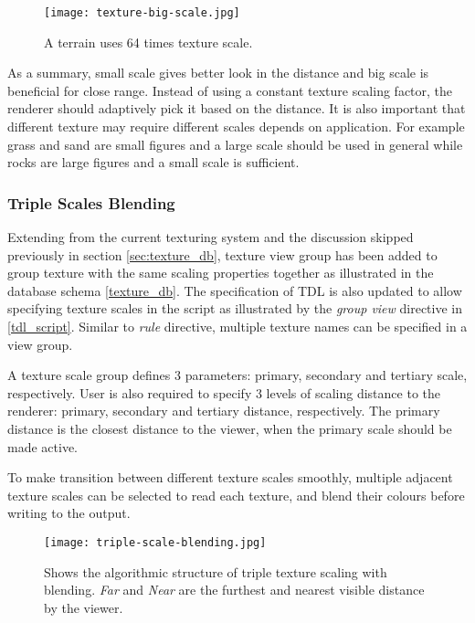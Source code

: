 \documentclass[oneside, a4paper]{report}
\begin{document}
    \begin{figure}[H]
        \texttt{[image: texture-big-scale.jpg]}
        \caption{A terrain uses 64 times texture scale.}
    \end{figure}

    As a summary, small scale gives better look in the distance and big scale is beneficial for close range. Instead of using a constant texture scaling factor, the renderer should adaptively pick it based on the distance. It is also important that different texture may require different scales depends on application. For example grass and sand are small figures and a large scale should be used in general while rocks are large figures and a small scale is sufficient.

    \subsubsection{Triple Scales Blending}

    Extending from the current texturing system and the discussion skipped previously in section \ref{sec:texture_db}, texture view group has been added to group texture with the same scaling properties together as illustrated in the database schema \ref{texture_db}. The specification of TDL is also updated to allow specifying texture scales in the script as illustrated by the \textit{group view} directive in \ref{tdl_script}. Similar to \textit{rule} directive, multiple texture names can be specified in a view group.

    A texture scale group defines 3 parameters: primary, secondary and tertiary scale, respectively. User is also required to specify 3 levels of scaling distance to the renderer: primary, secondary and tertiary distance, respectively. The primary distance is the closest distance to the viewer, when the primary scale should be made active.

    To make transition between different texture scales smoothly, multiple adjacent texture scales can be selected to read each texture, and blend their colours before writing to the output.

    \begin{figure}[H]
        \center
        \texttt{[image: triple-scale-blending.jpg]}
        \caption{Shows the algorithmic structure of triple texture scaling with blending. \textit{Far} and \textit{Near} are the furthest and nearest visible distance by the viewer.}
        \label{triple_blending}
    \end{figure}
\end{document}
